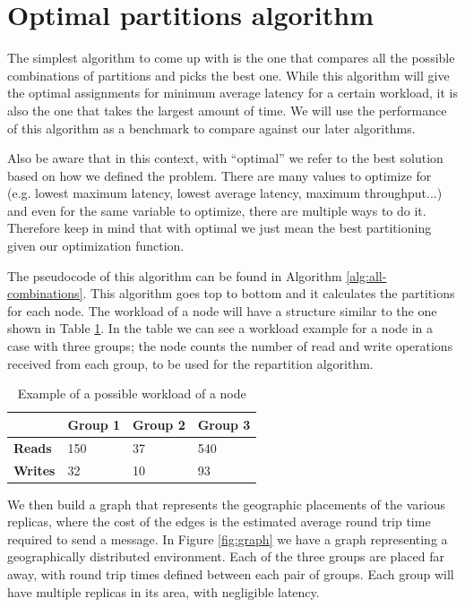 \section{Optimal partitions algorithm}\label{sec:optimal-partitions-algorithm} 
The simplest algorithm to come up with is the one that compares all the possible combinations of partitions and picks the best one. While this algorithm will give the optimal assignments for minimum average latency for a certain workload, it is also the one that takes the largest amount of time. We will use the performance of this algorithm as a benchmark to compare against our later algorithms.

Also be aware that in this context, with ``optimal'' we refer to the best solution based on how we defined the problem. There are many values to optimize for (e.g. lowest maximum latency, lowest average latency, maximum throughput...) and even for the same variable to optimize, there are multiple ways to do it. Therefore keep in mind that with optimal we just mean the best partitioning given our optimization function.

The pseudocode of this algorithm can be found in Algorithm \ref{alg:all-combinations}. This algorithm goes top to bottom and it calculates the partitions for each node. The workload of a node will have a structure similar to the one shown in Table \ref{tab:workload-example}. In the table we can see a workload example for a node in a case with three groups; the node counts the number of read and write operations received from each group, to be used for the repartition algorithm.

\begin{table}[!htb]
  \centering
  \begin{tabular}{l l l l}
    \hline
    & \textbf{Group 1} & \textbf{Group 2} & \textbf{Group 3} \\
    \hline
    \textbf{Reads} & 150 & 37 & 540 \\
    \textbf{Writes} & 32 & 10 & 93 \\
    \hline
  \end{tabular}
  \caption{Example of a possible workload of a node}\label{tab:workload-example}
\end{table}

We then build a graph that represents the geographic placements of the various replicas, where the cost of the edges is the estimated average round trip time required to send a message. In Figure \ref{fig:graph} we have a graph representing a geographically distributed environment. Each of the three groups are placed far away, with round trip times defined between each pair of groups. Each group will have multiple replicas in its area, with negligible latency.

